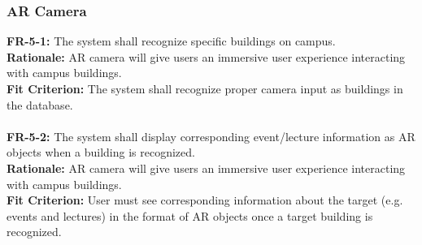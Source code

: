 \documentclass[12pt]{article}
\begin{document}
\subsubsection{AR Camera}
    \textbf{FR-5-1:} The system shall recognize specific buildings on campus.\\
    \textbf{Rationale:} AR camera will give users an immersive user experience interacting with campus buildings.\\
    \textbf{Fit Criterion:} The system shall recognize proper camera input as buildings in the database.\\\\
    \textbf{FR-5-2:} The system shall display corresponding event/lecture information as AR objects when a building is recognized.\\
    \textbf{Rationale:} AR camera will give users an immersive user experience interacting with campus buildings.\\
    \textbf{Fit Criterion:} User must see corresponding information about the target (e.g. events and lectures) in the format of AR objects once a target building is recognized.\\\\
\end{document}
